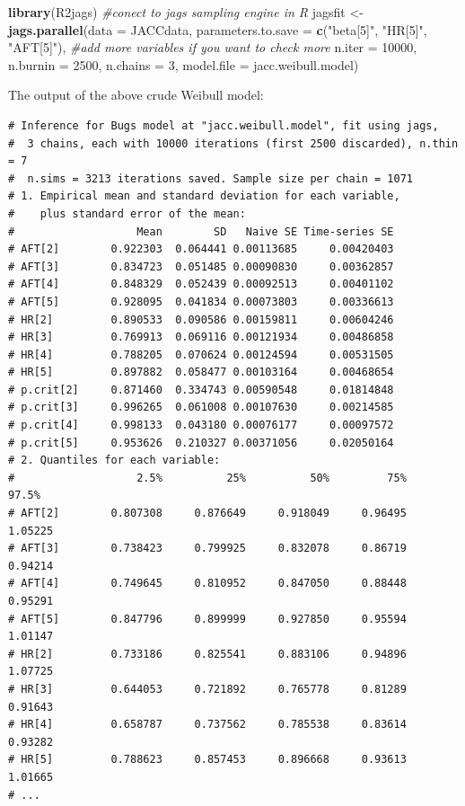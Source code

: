 \documentclass[]{tufte-handout}
\newenvironment{Shaded}{}{}
\newcommand{\CommentTok}[1]{\textcolor[rgb]{0.38,0.63,0.69}{\textit{#1}}}
\newcommand{\DataTypeTok}[1]{\textcolor[rgb]{0.56,0.13,0.00}{#1}}
\newcommand{\DecValTok}[1]{\textcolor[rgb]{0.25,0.63,0.44}{#1}}
\newcommand{\KeywordTok}[1]{\textcolor[rgb]{0.00,0.44,0.13}{\textbf{#1}}}
\newcommand{\NormalTok}[1]{#1}
\newcommand{\StringTok}[1]{\textcolor[rgb]{0.25,0.44,0.63}{#1}}
\begin{document}
\begin{Shaded}
\begin{Highlighting}[]
\KeywordTok{library}\NormalTok{(R2jags) }\CommentTok{#conect to jags sampling engine in R}
\NormalTok{jagsfit <-}\StringTok{ }\KeywordTok{jags.parallel}\NormalTok{(}\DataTypeTok{data =}\NormalTok{ JACCdata,}
                         \DataTypeTok{parameters.to.save =} \KeywordTok{c}\NormalTok{(}\StringTok{"beta[5]"}\NormalTok{, }\StringTok{"HR[5]"}\NormalTok{, }\StringTok{"AFT[5]"}\NormalTok{),}
                         \CommentTok{#add more variables if you want to check more}
                         \DataTypeTok{n.iter =} \DecValTok{10000}\NormalTok{, }
                         \DataTypeTok{n.burnin =} \DecValTok{2500}\NormalTok{, }
                         \DataTypeTok{n.chains =} \DecValTok{3}\NormalTok{,}
                         \DataTypeTok{model.file =}\NormalTok{ jacc.weibull.model)}
\end{Highlighting}
\end{Shaded}

The output of the above crude Weibull model:

\begin{verbatim}
# Inference for Bugs model at "jacc.weibull.model", fit using jags,
#  3 chains, each with 10000 iterations (first 2500 discarded), n.thin = 7
#  n.sims = 3213 iterations saved. Sample size per chain = 1071 
# 1. Empirical mean and standard deviation for each variable,
#    plus standard error of the mean:
#                   Mean        SD   Naive SE Time-series SE
# AFT[2]        0.922303  0.064441 0.00113685     0.00420403
# AFT[3]        0.834723  0.051485 0.00090830     0.00362857
# AFT[4]        0.848329  0.052439 0.00092513     0.00401102
# AFT[5]        0.928095  0.041834 0.00073803     0.00336613
# HR[2]         0.890533  0.090586 0.00159811     0.00604246
# HR[3]         0.769913  0.069116 0.00121934     0.00486858
# HR[4]         0.788205  0.070624 0.00124594     0.00531505
# HR[5]         0.897882  0.058477 0.00103164     0.00468654
# p.crit[2]     0.871460  0.334743 0.00590548     0.01814848
# p.crit[3]     0.996265  0.061008 0.00107630     0.00214585
# p.crit[4]     0.998133  0.043180 0.00076177     0.00097572
# p.crit[5]     0.953626  0.210327 0.00371056     0.02050164
# 2. Quantiles for each variable:
#                   2.5%          25%          50%         75%       97.5%
# AFT[2]        0.807308     0.876649     0.918049     0.96495     1.05225
# AFT[3]        0.738423     0.799925     0.832078     0.86719     0.94214
# AFT[4]        0.749645     0.810952     0.847050     0.88448     0.95291
# AFT[5]        0.847796     0.899999     0.927850     0.95594     1.01147
# HR[2]         0.733186     0.825541     0.883106     0.94896     1.07725
# HR[3]         0.644053     0.721892     0.765778     0.81289     0.91643
# HR[4]         0.658787     0.737562     0.785538     0.83614     0.93282
# HR[5]         0.788623     0.857453     0.896668     0.93613     1.01665
# ...
\end{verbatim}
\end{document}
